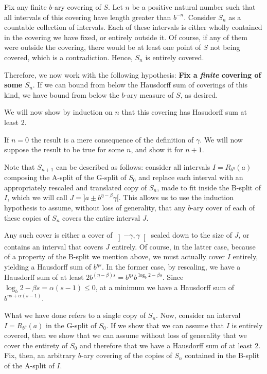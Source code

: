 \documentclass[11pt, reqno]{amsart}
\begin{document}
Fix any finite $b$-ary covering of $S$. Let $n$ be a positive natural number such that all intervals of this covering have length greater than $b^{-n}$. Consider $S_n$ as a countable collection of intervals. Each of these intervals is either wholly contained in the covering we have fixed, or entirely outside it. Of course, if any of them were outside the covering, there would be at least one point of $S$ not being covered, which is a contradiction. Hence, $S_n$ is entirely covered.

Therefore, we now work with the following hypothesis: \textbf{Fix a \emph{finite} covering of some $S_n$}. If we can bound from below the Hausdorff sum of coverings of this kind, we have bound from below the $b$-ary measure of $S$, as desired.

We will now show by induction on $n$ that this covering has Hasudorff sum at least 2.

If $n = 0$ the result is a mere consequence of the definition of $\gamma$. We will now suppose the result to be true for some $n$, and show it for $n+1$.

Note that $S_{n+1}$ can be described as follows: consider all intervals $I = R_{b^\eta}(a)$ composing the A-split of the G-split of $S_0$ and replace each interval with an appropriately rescaled and translated copy of $S_n$, made to fit inside the B-split of $I$, which we will call $J = ]a \pm b^{\eta - \beta} \gamma[$. This allows us to use the induction hypothesis to assume, without loss of generality, that any $b$-ary cover of each of these copies of $S_n$ covers the entire interval $J$.

Any such cover is either a cover of $\left]-\gamma, \gamma \right[$ scaled down to the size of $J$, or contains an interval that covers $J$ entirely. Of course, in the latter case, because of a property of the B-split we mention above, we must actually cover $I$ entirely, yielding a Hausdorff sum of $b^{\eta s}$. In the former case, by rescaling, we have a Hausdorff sum of at least $2 b^{(\eta - \beta) s} = b^{\eta s} b^{\log_b 2 - \beta s}$. Since $\log_b 2 - \beta s = \alpha (s - 1) \leq 0$, at a minimum we have a Hausdorff sum of $b^{\eta s + \alpha (s - 1)}$.

What we have done refers to a single copy of $S_n$. Now, consider an interval $I = R_{b^\eta}(a)$ in the G-split of $S_0$. If we show that we can assume that $I$ is entirely covered, then we show that we can assume without loss of generality that we cover the entirety of $S_0$ and therefore that we have a Hausdorff sum of at least 2. Fix, then, an arbitrary $b$-ary covering of the copies of $S_n$ contained in the B-split of the A-split of $I$.
\end{document}
